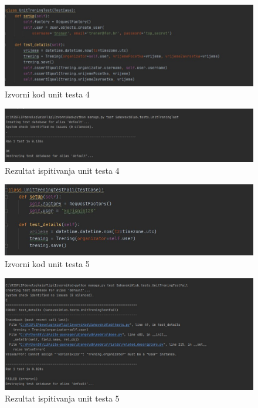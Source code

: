 \begin{figure}[H]
	\centerfloat
	\includegraphics[scale=0.55]{slike/unittest4izv.jpeg} %
	\caption{Izvorni kod unit testa 4}
	
\end{figure}

\begin{figure}[H]
	\centerfloat
	\includegraphics[scale=0.55]{slike/unittest4.jpeg} %
	\caption{Rezultat ispitivanja unit testa 4}
	
\end{figure}

\begin{figure}[H]
	\centerfloat
	\includegraphics[scale=0.55]{slike/unittest5izv.jpeg} %
	\caption{Izvorni kod unit testa 5}
	
\end{figure}

\begin{figure}[H]
	\centerfloat
	\includegraphics[scale=0.55]{slike/unittest5.jpeg} %
	\caption{Rezultat ispitivanja unit testa 5}
	
\end{figure}

